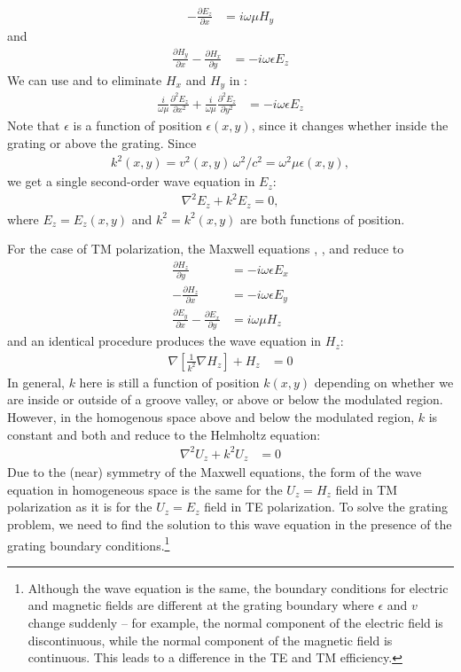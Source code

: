 \begin{align}
-\frac{\partial E_z}{\partial x} &= i \omega \mu H_y
\label{mete2}
\end{align}
and
\begin{align}
\frac{\partial H_y}{\partial x} - \frac{\partial H_x}{\partial y} &= - i \omega \epsilon E_z
\label{mete3}
\end{align}
We can use  and  to eliminate $H_x$ and $H_y$ in :
\begin{align}
\frac{i}{\omega \mu} \frac{\partial^2 E_z}{\partial x^2} + \frac{i}{\omega \mu}  \frac{\partial^2 E_z}{\partial y^2} &= -i \omega \epsilon E_z
\label{mete4}
\end{align}
Note that $\epsilon$ is a function of position $\epsilon(x,y)$, since it changes whether inside the grating or above the grating.  Since 
\begin{align}
k^2(x, y) = v^2(x,y)\, \omega^2/c^2 = \omega^2 \mu \epsilon(x, y),
\end{align}
we get a single second-order wave equation in $E_z$:
\begin{align}
\nabla^2 E_z + k^2 E_z = 0,
\label{wete}
\end{align}
where $E_z = E_z(x,y)$ and $k^2 = k^2(x,y)$ are both functions of position.


For the case of TM polarization, the Maxwell equations , , and  reduce to 
\begin{align}
\frac{\partial H_z}{\partial y} &= -i \omega \epsilon E_x \\
-\frac{\partial H_z}{\partial x} &= -i \omega \epsilon E_y \\
\frac{\partial E_y}{\partial x} - \frac{\partial E_x}{\partial y} &= i \omega \mu H_z
\end{align}
and an identical procedure produces the wave equation in $H_z$:
\begin{align}
\label{wetm}
\nabla\left[  \frac{1}{k^2} \nabla H_z  \right] + H_z &= 0%
\end{align}
In general, $k$ here is still a function of position $k(x,y)$ depending on whether we are inside or outside of a groove valley, or above or below the modulated region.  However, in the homogenous space above and below the modulated region, $k$ is constant and both  and  reduce to the Helmholtz equation:
\begin{align}
\nabla^2 U_z + k^2 U_z &= 0
\end{align}
Due to the (near) symmetry of the Maxwell equations, the form of the wave equation in homogeneous space is the same for the $U_z = H_z$ field in TM polarization as it is for the $U_z = E_z$ field in TE polarization.  To solve the grating problem, we need to find the solution to this wave equation in the presence of the grating boundary conditions.\footnote{Although the wave equation is the same, the boundary conditions for electric and magnetic fields are different at the grating boundary where $\epsilon$ and $v$ change suddenly -- for example, the normal component of the electric field is discontinuous, while the normal component of the magnetic field is continuous. This leads to a difference in the TE and TM efficiency.}
